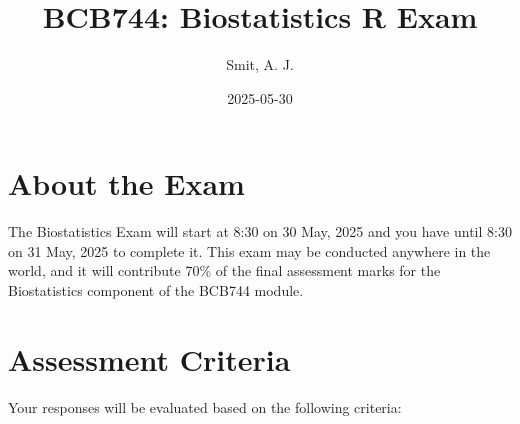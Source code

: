 \documentclass[
  british,
  10pt,
]{article}
\title{BCB744: Biostatistics R Exam}
\author{Smit, A. J.}
\date{2025-05-30}
\begin{document}
\maketitle


\section{About the Exam}\label{about-the-exam}

The Biostatistics Exam will start at 8:30 on 30 May, 2025 and you have
until 8:30 on 31 May, 2025 to complete it. This exam may be conducted
anywhere in the world, and it will contribute 70\% of the final
assessment marks for the Biostatistics component of the BCB744 module.

\section{Assessment Criteria}\label{assessment-criteria}

Your responses will be evaluated based on the following criteria:
\end{document}
